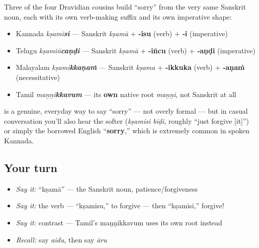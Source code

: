 \begin{cousinweb}
Three of the four Dravidian cousins build \textquotedblleft{}sorry\textquotedblright{} from the very same Sanskrit noun, each with its own verb-making suffix and its own imperative shape:

\begin{itemize}
\raggedright
  \item Kannada \textbf{} \emph{kṣami\textbf{si}} — Sanskrit \emph{kṣamā} + \textbf{‑isu} (verb) + \textbf{‑i} (imperative)
  \item Telugu \textbf{} \emph{kṣamin̄\textbf{caṇḍi}} — Sanskrit \emph{kṣamā} + \textbf{‑in̄cu} (verb) + \textbf{‑aṇḍi} (imperative)
  \item Malayalam \textbf{} \emph{kṣami\textbf{kkaṇaṁ}} — Sanskrit \emph{kṣama} + \textbf{‑ikkuka} (verb) + \textbf{‑aṇaṁ} (necessitative)
  \item Tamil \textbf{} \emph{maṉṉi\textbf{kkavum}} — its \textbf{own} native root \emph{maṉṉi}, not Sanskrit at all
\end{itemize}
\end{cousinweb}

\begin{culture}
\textbf{} is a genuine, everyday way to say \textquotedblleft{}sorry\textquotedblright{} — not overly formal — but in casual conversation you'll also hear the softer \textbf{ } (\emph{kṣamisi biḍi}, roughly \textquotedblleft{}just forgive {[}it{]}\textquotedblright{}) or simply the borrowed English \textquotedblleft{}\textbf{sorry},\textquotedblright{} which is extremely common in spoken Kannada.
\end{culture}

\subsection*{Your turn}
\begin{itemize}
\raggedright
  \item \emph{Say it:} \textquotedblleft{}kṣamā\textquotedblright{} — the Sanskrit noun, patience/forgiveness
  \item \emph{Say it:} the verb — \textquotedblleft{}kṣamisu,\textquotedblright{} to forgive — then \textquotedblleft{}kṣamisi,\textquotedblright{} forgive!
  \item \emph{Say it:} contrast — Tamil's maṉṉikkavum uses its own root instead
  \item \emph{Recall:} say \emph{aidu}, then say \emph{āru}
\end{itemize}

